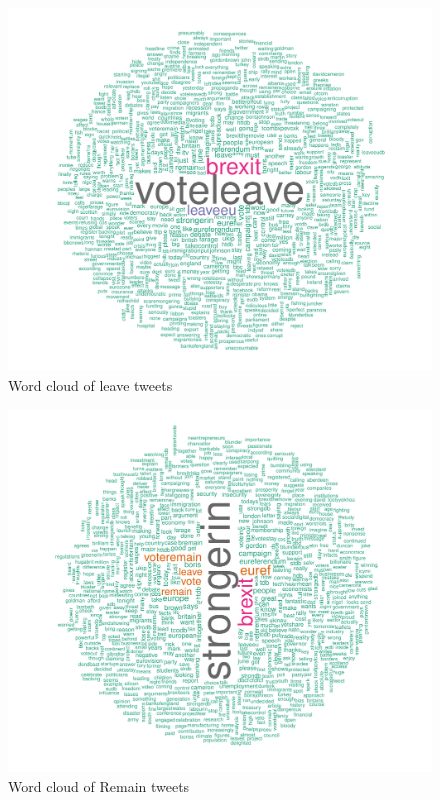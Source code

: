\documentclass[10pt  ,usenames, dvipsnames]{article}\usepackage[]{graphicx}\usepackage[]{color}
\newenvironment{knitrout}{}{} %
\begin{document}
\begin{figure}[H]
\begin{center}
\begin{knitrout}
\color{fgcolor}
\includegraphics[width=.80\linewidth]{figure/unnamed-chunk-76-1} 

\end{knitrout}
\caption {Word cloud of leave tweets}
\label{fig2}
\end {center}
\end {figure}


\begin{figure}[H]
\begin{center}
\begin{knitrout}
\color{fgcolor}
\includegraphics[width=.80\linewidth]{figure/unnamed-chunk-77-1} 

\end{knitrout}
\caption {Word cloud of Remain tweets}
\label{fig3}
\end {center}
\end {figure}
\end{document}
